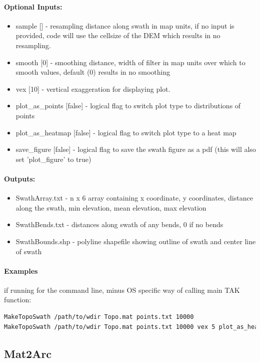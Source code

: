 \paragraph{Optional Inputs:}
\begin{itemize}
\item sample [] - resampling distance along swath in map units, if no input is provided, code will use the cellsize of the DEM 
which results in no resampling.
\item smooth [0] - smoothing distance, width of filter in map units over which to smooth values, default (0) results in no smoothing
\item vex [10] - vertical exaggeration for displaying plot.
\item plot\_as\_points [false] - logical flag to switch plot type to distributions of points
\item plot\_as\_heatmap [false] - logical flag to switch plot type to a heat map
\item save\_figure [false] - logical flag to save the swath figure as a pdf (this will also set 'plot\_figure' to true)
\end{itemize}

\paragraph{Outputs:}
\begin{itemize}
\item SwathArray.txt - n x 6 array containing x coordinate, y coordinates, distance along the swath, min elevation, mean elevation, max elevation
\item SwathBends.txt - distances along swath of any bends, 0 if no bends
\item SwathBounds.shp - polyline shapefile showing outline of swath and center line of swath
\end{itemize}

\paragraph{Examples} if running for the command line, minus OS specific way of calling main TAK function:
\begin{lstlisting}[language=bash]
MakeTopoSwath /path/to/wdir Topo.mat points.txt 10000
MakeTopoSwath /path/to/wdir Topo.mat points.txt 10000 vex 5 plot_as_heatmap true
\end{lstlisting}

\subsection{Mat2Arc}
